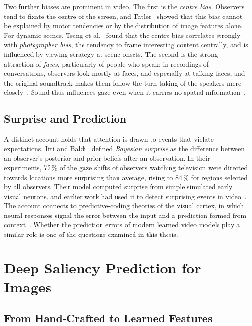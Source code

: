 Two further biases are prominent in video. The first is the \emph{centre bias}.
Observers tend to fixate the centre of the screen, and Tatler~\cite{tatler2007central}
showed that this bias cannot be explained by motor tendencies or by the
distribution of image features alone. For dynamic scenes, Tseng et
al.~\cite{tseng2009quantifying} found that the centre bias correlates strongly
with \emph{photographer bias}, the tendency to frame interesting content
centrally, and is influenced by viewing strategy at scene onsets. The second is
the strong attraction of \emph{faces}, particularly of people who speak: in
recordings of conversations, observers look mostly at faces, and especially at
talking faces, and the original soundtrack makes them follow the turn-taking of
the speakers more closely~\cite{coutrot2014how}. Sound thus influences gaze even
when it carries no spatial information~\cite{coutrot2012influence}.

\subsection{Surprise and Prediction}

A distinct account holds that attention is drawn to events that violate
expectations. Itti and Baldi~\cite{itti2009bayesian} defined \emph{Bayesian
surprise} as the difference between an observer's posterior and prior beliefs
after an observation. In their experiments, 72\,\% of the gaze shifts of
observers watching television were directed towards locations more surprising
than average, rising to 84\,\% for regions selected by all observers. Their
model computed surprise from simple simulated early visual neurons, and earlier
work had used it to detect surprising events in video~\cite{itti2005principled}.
The account connects to predictive-coding theories of the visual cortex, in
which neural responses signal the error between the input and a prediction
formed from context~\cite{rao1999predictive}. Whether the prediction errors of
modern learned video models play a similar role is one of the questions
examined in this thesis.

\section{Deep Saliency Prediction for Images}\label{sec:concept}

\subsection{From Hand-Crafted to Learned Features}

